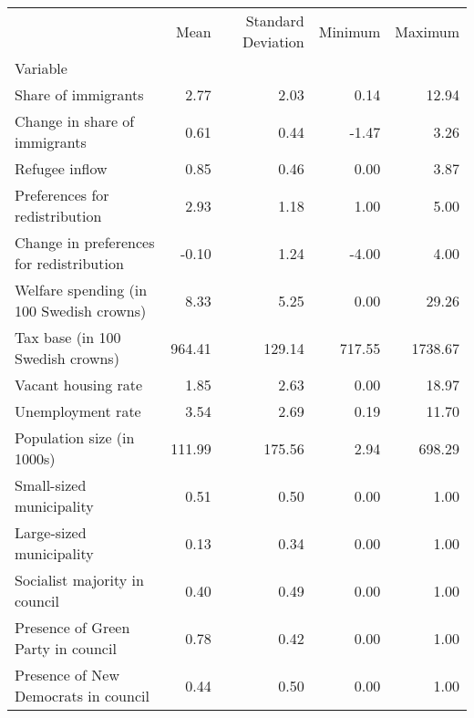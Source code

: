 \begin{tabular}{lrrrr}
\toprule
{} &    Mean &  Standard Deviation &  Minimum &  Maximum \\
Variable                                 &         &                     &          &          \\
\midrule
Share of immigrants                      &    2.77 &                2.03 &     0.14 &    12.94 \\
Change in share of immigrants            &    0.61 &                0.44 &    -1.47 &     3.26 \\
Refugee inflow                           &    0.85 &                0.46 &     0.00 &     3.87 \\
Preferences for redistribution           &    2.93 &                1.18 &     1.00 &     5.00 \\
Change in preferences for redistribution &   -0.10 &                1.24 &    -4.00 &     4.00 \\
Welfare spending (in 100 Swedish crowns) &    8.33 &                5.25 &     0.00 &    29.26 \\
Tax base (in 100 Swedish crowns)         &  964.41 &              129.14 &   717.55 &  1738.67 \\
Vacant housing rate                      &    1.85 &                2.63 &     0.00 &    18.97 \\
Unemployment rate                        &    3.54 &                2.69 &     0.19 &    11.70 \\
Population size (in 1000s)               &  111.99 &              175.56 &     2.94 &   698.29 \\
Small-sized municipality                 &    0.51 &                0.50 &     0.00 &     1.00 \\
Large-sized municipality                 &    0.13 &                0.34 &     0.00 &     1.00 \\
Socialist majority in council            &    0.40 &                0.49 &     0.00 &     1.00 \\
Presence of Green Party in council       &    0.78 &                0.42 &     0.00 &     1.00 \\
Presence of New Democrats in council     &    0.44 &                0.50 &     0.00 &     1.00 \\
\bottomrule
\end{tabular}
